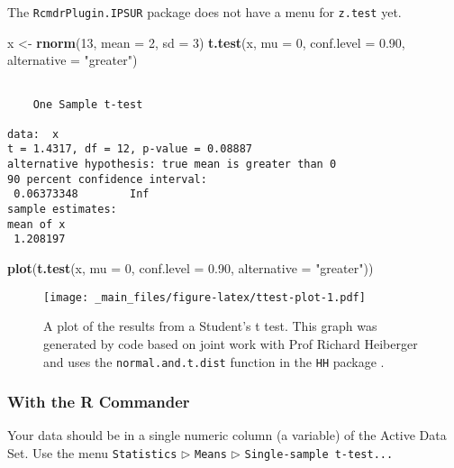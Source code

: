 \documentclass[]{book}
\newenvironment{Shaded}{\begin{snugshade}}{\end{snugshade}}
\newcommand{\KeywordTok}[1]{\textcolor[rgb]{0.13,0.29,0.53}{\textbf{{#1}}}}
\newcommand{\DataTypeTok}[1]{\textcolor[rgb]{0.13,0.29,0.53}{{#1}}}
\newcommand{\DecValTok}[1]{\textcolor[rgb]{0.00,0.00,0.81}{{#1}}}
\newcommand{\FloatTok}[1]{\textcolor[rgb]{0.00,0.00,0.81}{{#1}}}
\newcommand{\StringTok}[1]{\textcolor[rgb]{0.31,0.60,0.02}{{#1}}}
\newcommand{\NormalTok}[1]{{#1}}
\numberwithin{equation}{chapter}
\numberwithin{figure}{chapter}
\theoremstyle{plain}
\theoremstyle{definition}
\theoremstyle{remark}
\theoremstyle{definition}
\theoremstyle{definition}
\theoremstyle{remark}
\begin{document}
The \texttt{RcmdrPlugin.IPSUR} package \autocite{RcmdrPlugin.IPSUR} does
not have a menu for \texttt{z.test} yet.

\begin{Shaded}
\begin{Highlighting}[]
\NormalTok{x <-}\StringTok{ }\KeywordTok{rnorm}\NormalTok{(}\DecValTok{13}\NormalTok{, }\DataTypeTok{mean =} \DecValTok{2}\NormalTok{, }\DataTypeTok{sd =} \DecValTok{3}\NormalTok{)}
\KeywordTok{t.test}\NormalTok{(x, }\DataTypeTok{mu =} \DecValTok{0}\NormalTok{, }\DataTypeTok{conf.level =} \FloatTok{0.90}\NormalTok{, }\DataTypeTok{alternative =} \StringTok{"greater"}\NormalTok{)}
\end{Highlighting}
\end{Shaded}

\begin{verbatim}

    One Sample t-test

data:  x
t = 1.4317, df = 12, p-value = 0.08887
alternative hypothesis: true mean is greater than 0
90 percent confidence interval:
 0.06373348        Inf
sample estimates:
mean of x 
 1.208197 
\end{verbatim}

\begin{Shaded}
\begin{Highlighting}[]
\KeywordTok{plot}\NormalTok{(}\KeywordTok{t.test}\NormalTok{(x, }\DataTypeTok{mu =} \DecValTok{0}\NormalTok{, }\DataTypeTok{conf.level =} \FloatTok{0.90}\NormalTok{, }\DataTypeTok{alternative =} \StringTok{"greater"}\NormalTok{))}
\end{Highlighting}
\end{Shaded}

\begin{figure}[htbp]
\centering
\texttt{[image: \_main\_files/figure-latex/ttest-plot-1.pdf]}
\caption{\label{fig:ttest-plot}\small A plot of the results from a Student's t
test. This graph was generated by code based on joint work with Prof
Richard Heiberger and uses the \texttt{normal.and.t.dist} function in
the \texttt{HH} package \autocite{HH}.}
\end{figure}






\subsubsection{With the R Commander}\label{with-the-r-commander-1}

Your data should be in a single numeric column (a variable) of the
Active Data Set. Use the menu \texttt{Statistics} \(\triangleright\)
\texttt{Means} \(\triangleright\) \texttt{Single-sample\ t-test...}
\end{document}
